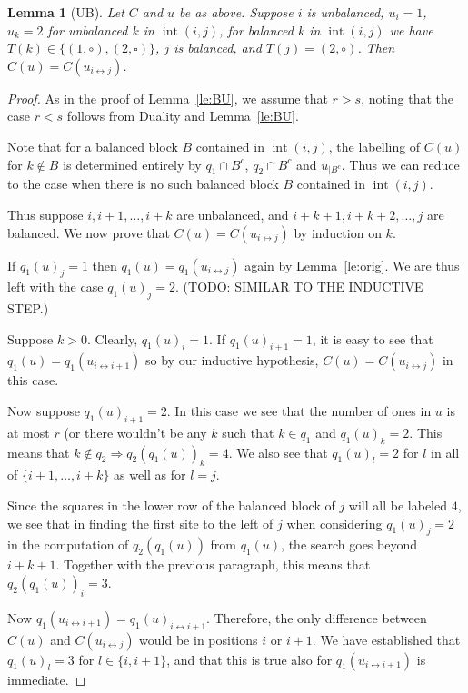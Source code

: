 \documentclass[reqno]{amsart}
\newcommand{\0}{\phantom{c}}
\DeclareMathOperator{\inter}{int} %
\theoremstyle{plain}
\newtheorem{lemma}[thm]{Lemma}
\theoremstyle{definition}
\numberwithin{equation}{section}
\begin{document}
\begin{lemma}[UB]
\label{le:UB}
  Let $C$ and $u$ be as above. Suppose $i$ is unbalanced, $u_i = 1$, $u_k = 2$ for unbalanced $k$ in $\inter(i,j)$, for balanced $k$ in $\inter(i,j)$ we have $T(k) \in \{(1,\circ),(2,\square)\}$, $j$ is balanced, and $T(j) = (2,\circ)$. Then $C(u) = C(u_{i \leftrightarrow j})$.
\end{lemma}
\begin{proof}
  As in the proof of Lemma~\ref{le:BU}, we assume that $r > s$, noting that the case $r < s$ follows from Duality and Lemma~\ref{le:BU}.
  
  Note that for a balanced block $B$ contained in $\inter(i,j)$, the labelling of $C(u)$ for $k \notin B$ is determined entirely by $q_1\cap B^c$, $q_2\cap B^c$ and $u_{|B^c}$. Thus we can reduce to the case when there is no such balanced block $B$ contained in $\inter(i,j)$.  

  Thus suppose $i, i+1, \dots, i+k$ are unbalanced, and $i+k+1, i+k+2, \dots, j$ are balanced. We now prove that $C(u) = C(u_{i\leftrightarrow j})$ by induction on $k$. 
  
  \vspace{10pt}

  If $q_1(u)_j = 1$ then $q_1(u) = q_1(u_{i\leftrightarrow j})$ again by Lemma~\ref{le:orig}. We are thus left with the case $q_1(u)_j = 2$. (TODO: SIMILAR TO THE INDUCTIVE STEP.)

  \vspace{10pt}

  Suppose $k > 0$. Clearly, $q_1(u)_i = 1$. If $q_1(u)_{i+1} = 1$, it is easy to see that $q_1(u) = q_1(u_{i\leftrightarrow i+1})$ so by our inductive hypothesis, $C(u) = C(u_{i\leftrightarrow j})$ in this case. 

  Now suppose $q_1(u)_{i+1} = 2$. In this case we see that the number of ones in $u$ is at most $r$ (or there wouldn't be any $k$ such that $k \in q_1$ and $q_1(u)_k=2$. This means that $k\notin q_2 \Rightarrow q_2(q_1(u))_k = 4$. We also see that $q_1(u)_l = 2$ for $l$ in all of $\{i+1,\dots, i+k\}$ as well as for $l= j$.

  Since the squares in the lower row of the balanced block of $j$ will all be labeled $4$, we see that in finding the first site to the left of $j$ when considering $q_1(u)_j = 2$ in the computation of $q_2(q_1(u))$ from $q_1(u)$, the search goes beyond $i+k+1$. Together with the previous paragraph, this means that $q_2(q_1(u))_i = 3$.

  Now $q_1(u_{i\leftrightarrow i+1}) = q_1(u)_{i\leftrightarrow i+1}$. Therefore, the only difference between $C(u)$ and $C(u_{i\leftrightarrow j})$ would be in positions $i$ or $i+1$. We have established that $q_1(u)_l = 3$ for $l \in \{i,i+1\}$, and that this is true also for $q_1(u_{i\leftrightarrow i+1})$ is immediate.

\end{proof}
\end{document}
